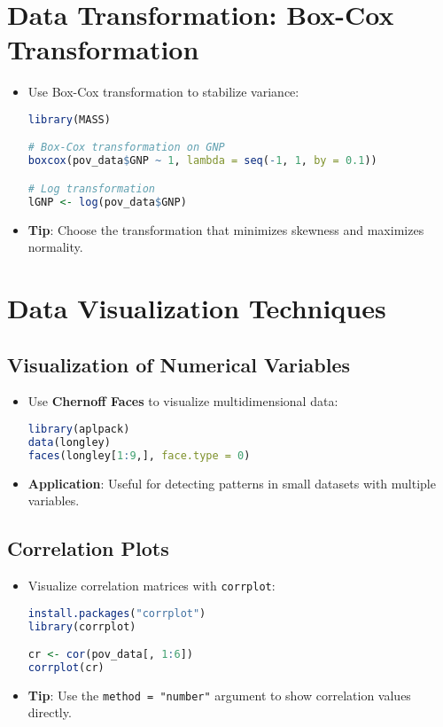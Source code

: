 \section{Data Transformation: Box-Cox Transformation}
\begin{itemize}
    \item Use Box-Cox transformation to stabilize variance:
\begin{lstlisting}[language=R]
library(MASS)

# Box-Cox transformation on GNP
boxcox(pov_data$GNP ~ 1, lambda = seq(-1, 1, by = 0.1))

# Log transformation
lGNP <- log(pov_data$GNP)
\end{lstlisting}

\item \textbf{Tip}: Choose the transformation that minimizes skewness and maximizes normality.
\end{itemize}

\section{Data Visualization Techniques}
\subsection{Visualization of Numerical Variables}
\begin{itemize}
    \item Use \textbf{Chernoff Faces} to visualize multidimensional data:
\begin{lstlisting}[language=R]
library(aplpack)
data(longley)
faces(longley[1:9,], face.type = 0)
\end{lstlisting}

\item \textbf{Application}: Useful for detecting patterns in small datasets with multiple variables.
\end{itemize}

\subsection{Correlation Plots}
\begin{itemize}
    \item Visualize correlation matrices with \texttt{corrplot}:
\begin{lstlisting}[language=R]
install.packages("corrplot")
library(corrplot)

cr <- cor(pov_data[, 1:6])
corrplot(cr)
\end{lstlisting}

\item \textbf{Tip}: Use the \texttt{method = "number"} argument to show correlation values directly.
\end{itemize}

